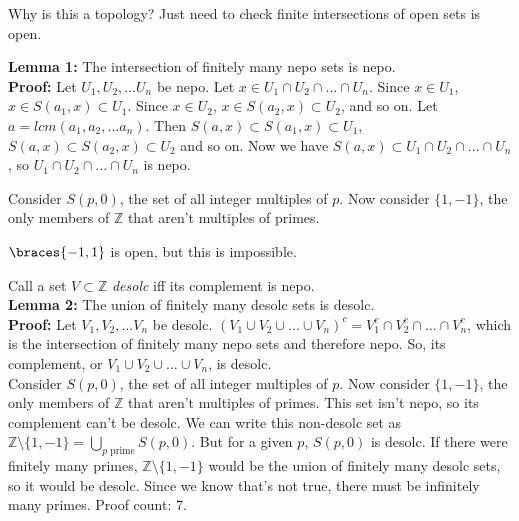 \documentclass[12pt]{scrartcl}
\begin{document}
Why is this a topology? Just need to check finite intersections of open sets is open.

\textbf{Lemma 1:} The intersection of finitely many nepo sets is nepo. \\
\textbf{Proof:} Let $U_1, U_2, ... U_n$ be nepo. Let $x \in U_1 \cap U_2 \cap ... \cap U_n$. Since $x \in U_1$, $x \in S(a_1, x) \subset U_1$. Since $x \in U_2$, $x \in S(a_2, x) \subset U_2$, and so on. Let $a = lcm(a_1, a_2, ... a_n)$. Then $S(a, x) \subset S(a_1, x) \subset U_1$, $S(a, x) \subset S(a_2, x) \subset U_2$ and so on. Now we have $S(a,x) \subset U_1 \cap U_2 \cap ... \cap U_n$, so $U_1 \cap U_2 \cap ... \cap U_n$ is nepo.

Consider $S(p, 0)$, the set of all integer multiples of $p$. Now consider $\{1, -1\}$, the only members of $\mathbb{Z}$ that aren't multiples of primes.

$\braces{-1,1}$ is open, but this is impossible.


Call a set $V \subset \mathbb{Z}$ \textit{desolc} iff its complement is nepo. \\
\textbf{Lemma 2:} The union of finitely many desolc sets is desolc. \\
\textbf{Proof:} Let $V_1, V_2, ... V_n$ be desolc. $(V_1 \cup V_2 \cup ... \cup V_n)^c = V_1^c \cap V_2^c \cap ... \cap V_n^c$, which is the intersection of finitely many nepo sets and therefore nepo. So, its complement, or $V_1 \cup V_2 \cup ... \cup V_n$, is desolc.\\
Consider $S(p, 0)$, the set of all integer multiples of $p$. Now consider $\{1, -1\}$, the only members of $\mathbb{Z}$ that aren't multiples of primes. This set isn't nepo, so its complement can't be desolc. We can write this non-desolc set as $\mathbb{Z} \setminus \{1, -1\} = \bigcup_{p \textrm{ prime}}S(p, 0)$. But for a given $p$, $S(p, 0)$ is desolc. If there were finitely many primes, $\mathbb{Z} \setminus \{1, -1\}$ would be the union of finitely many desolc sets, so it would be desolc. Since we know that's not true, there must be infinitely many primes. Proof count: 7.
\end{document}
